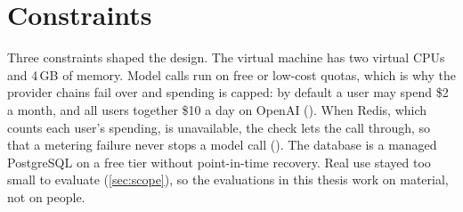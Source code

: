 \section{Constraints}
\label{sec:constraints}

Three constraints shaped the design. The virtual machine has two virtual
CPUs and 4\,GB of memory. Model calls run on free or low-cost quotas, which
is why the provider chains fail over and spending is capped: by default a
user may spend \$2 a month, and all users together \$10 a day on OpenAI
(). When Redis, which counts each
user's spending, is unavailable, the check lets the call through, so that a
metering failure never stops a model call
(). The database
is a managed PostgreSQL on a free tier without point-in-time recovery. Real
use stayed too small to evaluate (\cref{sec:scope}), so the evaluations in
this thesis work on material, not on people.
